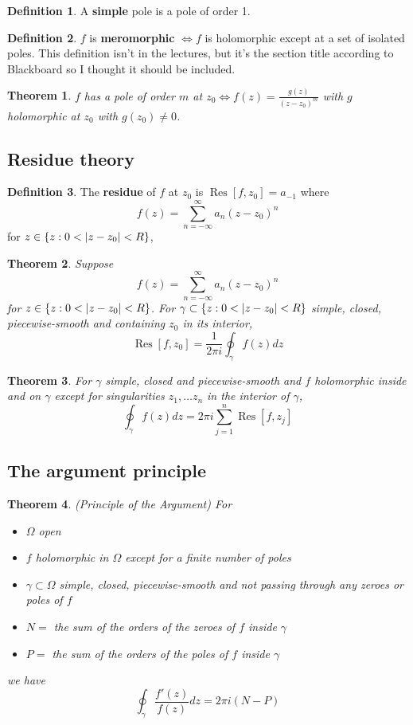 \documentclass[12pt]{article}
\newtheorem{thm}{Theorem}[section]
\theoremstyle{definition}
\newtheorem{defn}{Definition}[section]
\DeclarePairedDelimiter\abs{\lvert}{\rvert}
\DeclareMathOperator{\Res}{Res}
\begin{document}
\begin{defn}
  A \textbf{simple} pole is a pole of order 1.
\end{defn}

\begin{defn}
  $f$ is \textbf{meromorphic} $\iff f$ is holomorphic except at a set of isolated poles.
  This definition isn't in the lectures, but it's the section title according to Blackboard so I thought it should be included.
\end{defn}

\begin{thm}
  $f$ has a pole of order $m$ at $z_0 \iff f(z) = \frac{g(z)}{(z - z_0)^m}$ with $g$ holomorphic at $z_0$ with $g(z_0) \neq 0$.
\end{thm}

\subsection{Residue theory}

\begin{defn}
  The \textbf{residue} of $f$ at $z_0$ is $\Res{[f, z_0]} = a_{-1}$ where
  $$f(z) = \sum_{n = -\infty}^{\infty}a_n(z - z_0)^n$$
  for $z \in \{z : 0 < \abs{z - z_0} < R\}$,
\end{defn}

\begin{thm}
  Suppose
  $$f(z) = \sum_{n = -\infty}^{\infty}a_n(z - z_0)^n$$
  for $z \in \{z : 0 < \abs{z - z_0} < R\}$.
  For $\gamma \subset \{z : 0 < \abs{z - z_0} < R\}$ simple, closed, piecewise-smooth and containing $z_0$ in its interior,
  $$\Res{[f, z_0]} = \frac{1}{2\pi i}\oint_{\gamma}f(z)dz$$
\end{thm}

\begin{thm}
  For $\gamma$ simple, closed and piecewise-smooth and $f$ holomorphic inside and on $\gamma$ except for singularities $z_1, \ldots z_n$ in the interior of $\gamma$,
  $$\oint_{\gamma}f(z)dz = 2\pi i\sum_{j = 1}^n\Res{[f, z_j]}$$
\end{thm}

\subsection{The argument principle}

\begin{thm}
  (Principle of the Argument)
  For 
  \begin{itemize}
    \item $\Omega$ open
    \item $f$ holomorphic in $\Omega$ except for a finite number of poles
    \item $\gamma \subset \Omega$ simple, closed, piecewise-smooth and not passing through any zeroes or poles of $f$
    \item $N =$ the sum of the orders of the zeroes of $f$ inside $\gamma$
    \item $P =$ the sum of the orders of the poles of $f$ inside $\gamma$
  \end{itemize}
  we have
  $$\oint_{\gamma}\frac{f'(z)}{f(z)}dz = 2\pi i(N - P)$$
\end{thm}
\end{document}
